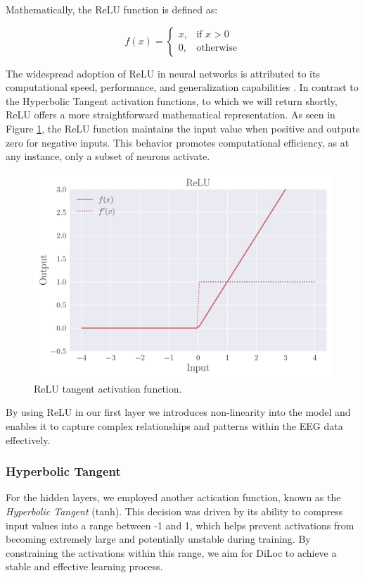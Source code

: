 \documentclass[a4paper, UKenglish, 11pt]{uiomaster}
\begin{document}
Mathematically, the ReLU function is defined as:

\begin{equation}
f(x) = \begin{cases}
x, & \text{if } x > 0 \\
0, & \text{otherwise}
\end{cases}
\label{eq:ReLU}
\end{equation}

The widespread adoption of ReLU in neural networks is attributed to its computational speed, performance, and generalization capabilities \cite{wandb_activation_functions}. In contrast to the Hyperbolic Tangent activation functions, to which we will return shortly, ReLU offers a more straightforward mathematical representation. As seen in Figure \ref{fig:ReLU}, the ReLU function maintains the input value when positive and outputs zero for negative inputs. This behavior promotes computational efficiency, as at any instance, only a subset of neurons activate.

\begin{figure}
    \centering
    \includegraphics[width=\linewidth]{figures/ReLU.pdf}
    \caption{ReLU tangent activation function.}
    \label{fig:ReLU}
\end{figure}

By using ReLU in our first layer we introduces non-linearity into the model and enables it to capture complex relationships and patterns within the EEG data effectively.



\subsubsection{Hyperbolic Tangent}
For the hidden layers, we employed another actication function, known as the \emph{Hyperbolic Tangent} (tanh). This decision was driven by its ability to compress input values into a range between -1 and 1, which helps prevent activations from becoming extremely large and potentially unstable during training. By constraining the activations within this range, we aim for DiLoc to achieve a stable and effective learning process.
\end{document}
